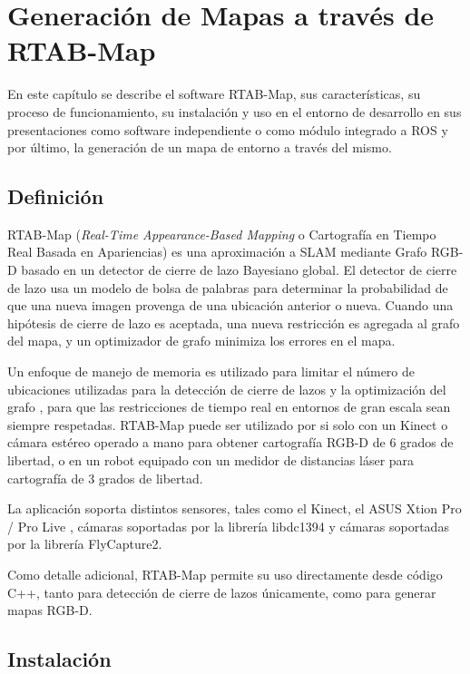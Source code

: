 \chapter{Generación de Mapas a través de RTAB-Map}

En este capítulo se describe el software RTAB-Map, sus características, su proceso de funcionamiento, su instalación y uso en el entorno de desarrollo en sus presentaciones como software independiente o como módulo integrado a ROS y por último, la generación de un mapa de entorno a través del mismo.

\section{Definición}

RTAB-Map (\textit{Real-Time Appearance-Based Mapping} o Cartografía en Tiempo Real Basada en Apariencias) es una aproximación a SLAM mediante Grafo RGB-D basado en un detector de cierre de lazo Bayesiano global. El detector de cierre de lazo usa un modelo de bolsa de palabras para determinar la probabilidad de que una nueva imagen provenga de una ubicación anterior o nueva. Cuando una hipótesis de cierre de lazo es aceptada, una nueva restricción es agregada al grafo del mapa, y un optimizador de grafo minimiza los errores en el mapa. \cite{labbe14online}

Un enfoque de manejo de memoria es utilizado para limitar el número de ubicaciones utilizadas para la detección de cierre de lazos y la optimización del grafo \cite{labbe13appearance}, para que las restricciones de tiempo real en entornos de gran escala sean siempre respetadas. RTAB-Map puede ser utilizado por si solo con un Kinect o cámara estéreo operado a mano para obtener cartografía RGB-D de 6 grados de libertad, o en un robot equipado con un medidor de distancias láser para cartografía de 3 grados de libertad. \cite{rtabmaphome}

La aplicación soporta distintos sensores, tales como el Kinect, el ASUS Xtion Pro / Pro Live \cite{xtionpro} \cite{xtionprolive}, cámaras soportadas por la librería libdc1394 \cite{libdc1394} y cámaras soportadas por la librería FlyCapture2. \cite{libflycapture2}

Como detalle adicional, RTAB-Map permite su uso directamente desde código C++, tanto para detección de cierre de lazos únicamente, como para generar mapas RGB-D.

\section{Instalación}

